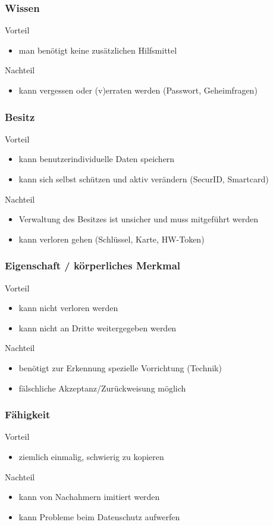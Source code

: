 \subsubsection*{Wissen}
Vorteil
\begin{itemize}
    \item man benötigt keine zusätzlichen Hilfsmittel
\end{itemize}
Nachteil
\begin{itemize}
    \item kann vergessen oder (v)erraten werden (Passwort, Geheimfragen)
\end{itemize}

\subsubsection*{Besitz}
Vorteil
\begin{itemize}
    \item kann benutzerindividuelle Daten speichern
    \item kann sich selbst schützen und aktiv verändern (SecurID, Smartcard)
\end{itemize}
Nachteil
\begin{itemize}
    \item Verwaltung des Besitzes ist unsicher und muss mitgeführt werden
    \item kann verloren gehen (Schlüssel, Karte, HW-Token)
\end{itemize}

\subsubsection*{Eigenschaft / körperliches Merkmal}
Vorteil
\begin{itemize}
    \item kann nicht verloren werden
    \item kann nicht an Dritte weitergegeben werden
\end{itemize}
Nachteil
\begin{itemize}
    \item benötigt zur Erkennung spezielle Vorrichtung (Technik)
    \item fälschliche Akzeptanz/Zurückweisung möglich
\end{itemize}

\subsubsection*{Fähigkeit}
Vorteil
\begin{itemize}
    \item ziemlich einmalig, schwierig zu kopieren
\end{itemize}
Nachteil
\begin{itemize}
    \item kann von Nachahmern imitiert werden
    \item kann Probleme beim Datenschutz aufwerfen
\end{itemize}

